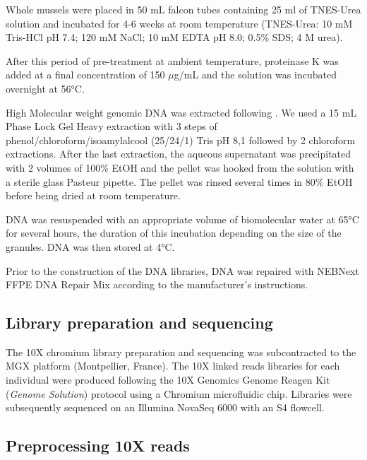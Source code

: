 \documentclass[11pt, a4paper]{article}
\begin{document}
Whole mussels were placed in 50 mL falcon tubes containing 25 ml of TNES-Urea solution and incubated for 4-6 weeks at room temperature (TNES-Urea: 10 mM Tris-HCl pH 7.4; 120 mM NaCl; 10 mM EDTA pH 8.0; 0.5\% SDS; 4 M urea).

After this period of pre-treatment at ambient temperature, proteinase K was added at a final concentration of 150 \(\mu\)g/mL and the solution was incubated overnight at 56°C.

High Molecular weight genomic DNA was extracted following \textcite{Nakayama1994}.
We used a 15 mL Phase Lock Gel Heavy extraction with 3 steps of phenol/chloroform/isoamylalcool (25/24/1) Tris pH 8,1 followed by 2 chloroform extractions.
After the last extraction, the aqueous supernatant was precipitated with 2 volumes of 100\% EtOH and the pellet was hooked from the solution with a sterile glass Pasteur pipette.
The pellet was rinsed several times in 80\% EtOH before being dried at room temperature.

DNA was resuspended with an appropriate volume of biomolecular water at 65°C for several hours, the duration of this incubation depending on the size of the granules.
DNA was then stored at 4°C.

Prior to the construction of the DNA libraries, DNA was repaired with NEBNext FFPE DNA Repair Mix according to the manufacturer's instructions.


\subsection{Library preparation and sequencing}

The 10X chromium library preparation and sequencing was subcontracted to the MGX platform (Montpellier, France).
The 10X linked reads libraries for each individual were produced following the 10X Genomics Genome Reagen Kit (\emph{Genome Solution}) protocol using a Chromium microfluidic chip.
Libraries were subsequently sequenced on an Illumina NovaSeq 6000 with an S4 flowcell.

\subsection{Preprocessing 10X reads}\label{preproc}
\end{document}

